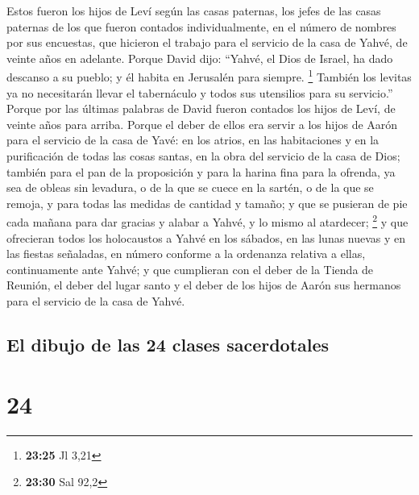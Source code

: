  Estos fueron los hijos de Leví según las casas paternas,
los jefes de las casas paternas de los que fueron contados
individualmente, en el número de nombres por sus encuestas, que hicieron
el trabajo para el servicio de la casa de Yahvé, de veinte años en
adelante.  Porque David dijo: ``Yahvé, el Dios de Israel,
ha dado descanso a su pueblo; y él habita en Jerusalén para siempre.
\footnote{\textbf{23:25} Jl 3,21}  También los levitas ya
no necesitarán llevar el tabernáculo y todos sus utensilios para su
servicio.''  Porque por las últimas palabras de David
fueron contados los hijos de Leví, de veinte años para arriba.
 Porque el deber de ellos era servir a los hijos de Aarón
para el servicio de la casa de Yavé: en los atrios, en las habitaciones
y en la purificación de todas las cosas santas, en la obra del servicio
de la casa de Dios;  también para el pan de la
proposición y para la harina fina para la ofrenda, ya sea de obleas sin
levadura, o de la que se cuece en la sartén, o de la que se remoja, y
para todas las medidas de cantidad y tamaño;  y que se
pusieran de pie cada mañana para dar gracias y alabar a Yahvé, y lo
mismo al atardecer; \footnote{\textbf{23:30} Sal 92,2}  y
que ofrecieran todos los holocaustos a Yahvé en los sábados, en las
lunas nuevas y en las fiestas señaladas, en número conforme a la
ordenanza relativa a ellas, continuamente ante Yahvé;  y
que cumplieran con el deber de la Tienda de Reunión, el deber del lugar
santo y el deber de los hijos de Aarón sus hermanos para el servicio de
la casa de Yahvé.

\hypertarget{el-dibujo-de-las-24-clases-sacerdotales}{%
\subsection{El dibujo de las 24 clases
sacerdotales}\label{el-dibujo-de-las-24-clases-sacerdotales}}

\hypertarget{section-23}{%
\section{24}\label{section-23}}

